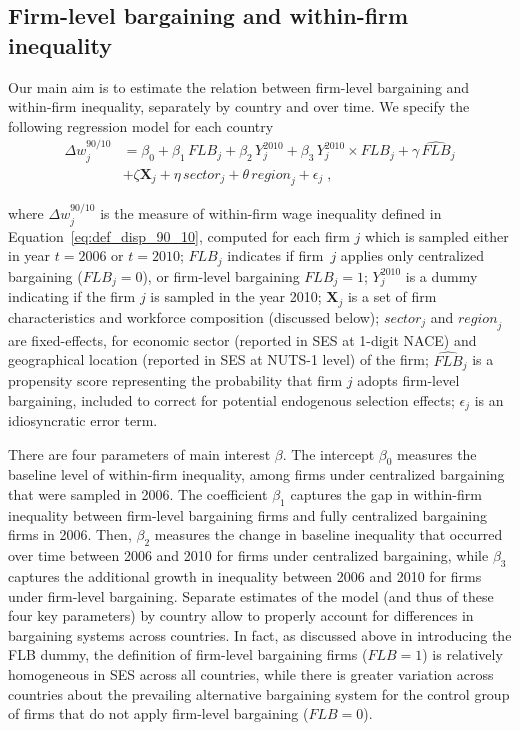 \documentclass[12pt]{article}
\begin{document}
\subsection{Firm-level bargaining and within-firm inequality}
Our main aim is to estimate the relation between firm-level bargaining and within-firm inequality, separately by country and over time. We specify the following regression model for each country
\begin{equation}
\label{eq:reg_dispersion}
\begin{split}
  \Delta w^{90/10}_j &= \beta_0 + \beta_1\, \mathit{FLB}_j + \beta_2\, \mathit{Y}^{2010}_j + \beta_3\, \mathit{Y}^{2010}_j \times \mathit{FLB}_j + \gamma\, \widehat{\mathit{FLB}}_j \\
                     &+ \zeta\mathbf{X}_j + \eta\, \mathit{sector}_j + \theta\, \mathit{region}_j + \epsilon_j \;,
\end{split}
\end{equation}

\noindent where $\Delta w_j^{90/10}$ is the measure of within-firm wage inequality defined in Equation~\eqref{eq:def_disp_90_10}, computed for each firm $j$ which is sampled either in year $t=2006$ or $t=2010$;
$\mathit{FLB}_j$ indicates if firm~$j$ applies only centralized bargaining ($\mathit{FLB}_j=0$), or firm-level bargaining $\mathit{FLB}_j=1$;
$\mathit{Y}^{2010}_j$ is a dummy indicating if the firm $j$ is sampled in the year 2010; $\mathbf{X}_j$ is a set of firm characteristics and workforce composition (discussed below); $\mathit{sector}_j$ and $\mathit{region}_j$ are fixed-effects, for economic sector (reported in SES at 1-digit NACE) and geographical location (reported in SES at NUTS-1 level) of the firm; $\widehat{\mathit{FLB}}_j$ is a propensity score representing the probability that firm $j$ adopts firm-level bargaining, included to correct for potential endogenous selection effects; $\epsilon_j$ is an idiosyncratic error term. 

There are four parameters of main interest $\beta$. The intercept $\beta_0$ measures the baseline level of within-firm inequality, among firms under centralized bargaining that were sampled in 2006. The coefficient $\beta_1$ captures the gap in within-firm inequality between firm-level bargaining firms and fully centralized bargaining firms in 2006. Then, $\beta_2$ measures the change in baseline inequality that occurred over time between 2006 and 2010 for firms under centralized bargaining, while $\beta_3$ captures the additional growth in inequality between 2006 and 2010 for firms under firm-level bargaining. Separate estimates of the model (and thus of these four key parameters) by country allow to properly account for differences in bargaining systems across countries. In fact, as discussed above in introducing the FLB dummy, the definition of firm-level bargaining firms ($\mathit{FLB}=1$) is relatively homogeneous in SES across all countries, while there is greater variation across countries about the prevailing alternative bargaining system for the control group of firms that do not apply firm-level bargaining ($\mathit{FLB}=0$).
\end{document}
